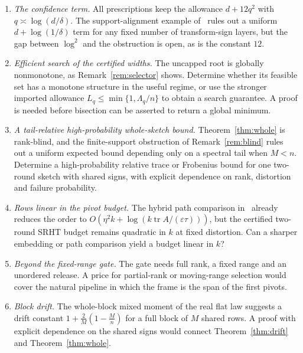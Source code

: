 \documentclass[11pt,a4paper]{article}
\theoremstyle{definition}
\theoremstyle{remark}
\numberwithin{equation}{section}
\newcommand{\tr}{\operatorname{tr}}
\newcommand{\eps}{\varepsilon}
\begin{document}
\begin{enumerate}[label=\arabic*.]
\item \emph{The confidence term.} All prescriptions keep the allowance
$d+12q^2$ with $q\asymp\log(d/\delta)$. The support-alignment example
of~\cite{SRHT2R,V11} rules out a uniform $d+\log(1/\delta)$ term for any fixed
number of transform-sign layers, but the gap between $\log^2$ and the
obstruction is open, as is the constant $12$.
\item \emph{Efficient search of the certified widths.}
The uncapped root is globally nonmonotone, as Remark~\ref{rem:selector}
shows. Determine whether its feasible set has a monotone structure in
the useful regime, or use the stronger imported allowance
$L_q\le\min\{1,\Lambda_q/n\}$ to obtain a search guarantee.
A proof is needed before bisection can be asserted to return a global
minimum.
\item \emph{A tail-relative high-probability whole-sketch bound.}
Theorem~\ref{thm:whole} is rank-blind, and the finite-support obstruction
of Remark~\ref{rem:blind} rules out a uniform expected bound depending
only on a spectral tail when $M<n$. Determine a high-probability relative
trace or Frobenius bound for one two-round sketch with shared signs,
with explicit dependence on rank, distortion and failure probability.
\item \emph{Rows linear in the pivot budget.} The hybrid path comparison
in~\cite{RobustRP} already reduces the order to
$O(\eta^2k+\log(k\tr A/(\eps\tau)))$, but the certified two-round SRHT
budget remains quadratic in $k$ at fixed distortion. Can a sharper
embedding or path comparison yield a budget linear in $k$?
\item \emph{Beyond the fixed-range gate.} The gate needs full rank, a fixed range and
an unordered release. A price for partial-rank or moving-range selection would
cover the natural pipeline in which the frame is the span of the first pivots.
\item \emph{Block drift.} The whole-block mixed moment of the real flat law suggests a
drift constant $1+\frac2M(1-\frac Mn)$ for a full block of $M$ shared rows. A
proof with explicit dependence on the shared signs would connect
Theorem~\ref{thm:drift} and Theorem~\ref{thm:whole}.
\end{enumerate}
\end{document}
